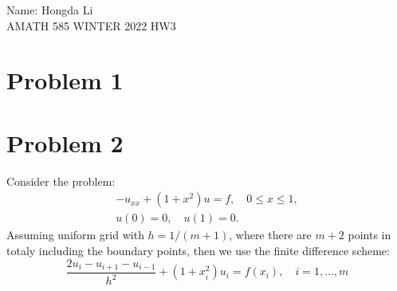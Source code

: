 \documentclass[]{article}
\begin{document}
\begin{center}
    Name: Hongda Li 
    \\
    AMATH 585 WINTER 2022 HW3
\end{center}
\section*{Problem 1}
\section*{Problem 2}
    Consider the problem: 
    \begin{align*}
        -u_{x x}+\left(1+x^{2}\right) u=f, \quad 0 \leq x \leq 1, \\
        u(0)=0, \quad u(1)=0 .
    \end{align*}
    Assuming uniform grid with $h = 1/(m + 1)$, where there are $m + 2$ points in totaly including the boundary points, then we use the finite difference scheme: 
    $$
        \frac{2 u_{i}-u_{i+1}-u_{i-1}}{h^{2}}+\left(1+x_{i}^{2}\right) u_{i}=f\left(x_{i}\right), \quad i=1, \ldots, m
    $$
\end{document}
